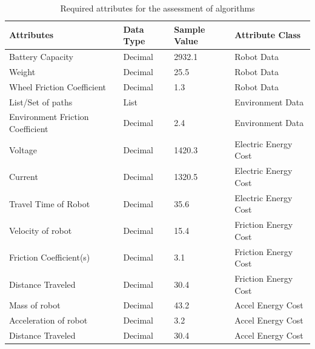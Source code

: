 \begin{table}[H]
\caption{Required attributes for the assessment of algorithms}\label{tab:inputs}
\centering
\footnotesize
\begin{tabular}{|l|l|l|l|}
\hline
\textbf{Attributes}          & \textbf{Data Type} & \textbf{Sample Value} & \textbf{Attribute Class}        \\ \hline
Battery Capacity                 & Decimal            & 2932.1                 & Robot Data               \\ \hline
Weight                           & Decimal            & 25.5                   & Robot Data               \\ \hline
Wheel Friction Coefficient       & Decimal            & 1.3                    & Robot Data               \\ \hline
List/Set of paths                & List               &                        & Environment Data         \\ \hline
Environment Friction Coefficient & Decimal            & 2.4                    & Environment Data         \\ \hline
Voltage                          & Decimal            & 1420.3                 & Electric Energy Cost   \\ \hline
Current                          & Decimal            & 1320.5                 & Electric Energy Cost   \\ \hline
Travel Time of Robot             & Decimal            & 35.6                   & Electric Energy Cost   \\ \hline
Velocity of robot                & Decimal            & 15.4                   & Friction Energy Cost   \\ \hline
Friction Coefficient(s)          & Decimal            & 3.1                    & Friction Energy Cost   \\ \hline
Distance Traveled                & Decimal            & 30.4                   & Friction Energy Cost   \\ \hline
Mass of robot                    & Decimal            & 43.2                   & Accel Energy Cost \\ \hline
Acceleration of robot            & Decimal            & 3.2                    & Accel Energy Cost \\ \hline
Distance Traveled                & Decimal            & 30.4                   & Accel Energy Cost \\ \hline
\end{tabular}
\end{table}

